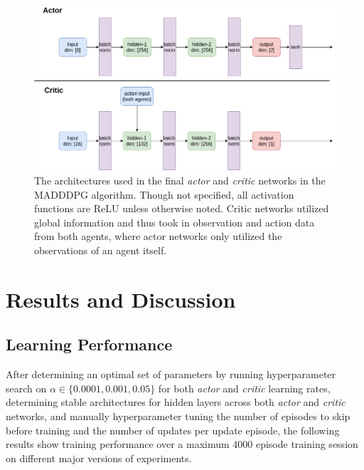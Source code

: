 \documentclass[11pt]{article}
\begin{document}
	\begin{figure}[!ht]
		\centering
		\includegraphics[width=0.75\linewidth]{images/nn_architectures.png}
		\caption{The architectures used in the final \textit{actor} and \textit{critic} networks in the MADDDPG algorithm. Though not specified, all activation functions are ReLU unless otherwise noted. Critic networks utilized global information and thus took in observation and action data from both agents, where actor networks only utilized the observations of an agent itself.}
		\label{fig:nn-architecture}
	\end{figure}
	
	\FloatBarrier
	
	\section{Results and Discussion}
	
	\subsection{Learning Performance}
	
	After determining an optimal set of parameters by running hyperparameter search on $\alpha \in \{0.0001, 0.001, 0.05\}$ for both \textit{actor} and \textit{critic} learning rates, determining stable architectures for hidden layers across both \textit{actor} and \textit{critic} networks, and manually hyperparameter tuning the number of episodes to skip before training and the number of updates per update episode, the following results show training performance over a maximum 4000 episode training session on different major versions of experiments.
	
	\FloatBarrier
	
\end{document}
